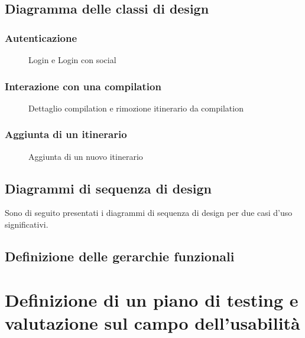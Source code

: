 \documentclass{natourDoc}
\begin{document}
\newpage
\subsection{Diagramma delle classi di design}

\subsubsection{Autenticazione}
\begin{figure}[!htbp]
	\centering
	
	\caption{Login e Login con social}
\end{figure}

\newpage
\subsubsection{Interazione con una compilation}
\begin{figure}[!htbp]
	\centering
	
	\caption{Dettaglio compilation e rimozione itinerario da compilation}
\end{figure}

\newpage
\subsubsection{Aggiunta di un itinerario}
\begin{figure}[!htbp]
	\centering
	
	\caption{Aggiunta di un nuovo itinerario}
\end{figure}



\newpage
\subsection{Diagrammi di sequenza di design}
Sono di seguito presentati i diagrammi di sequenza di design per due casi d'uso significativi.

\newpage
\subsection{Definizione delle gerarchie funzionali}

\newpage
\section{Definizione di un piano di testing e valutazione sul campo dell'usabilità}
\end{document}
